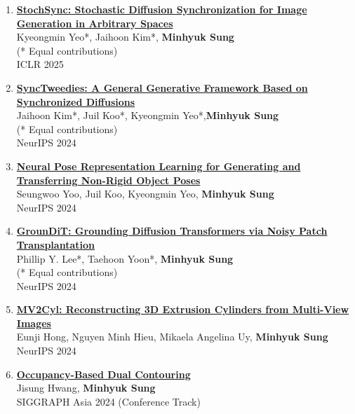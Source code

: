 \documentclass[letterpaper,10pt]{article} %
\newcommand{\blankline}{\quad\pagebreak[2]}
\begin{document}
{{\begin{enumerate}
\item \label{iclr25}
\href{https://arxiv.org/abs/2501.15445}{\textbf{StochSync: Stochastic Diffusion Synchronization for Image Generation in Arbitrary Spaces}}\\
Kyeongmin Yeo*, Jaihoon Kim*, \textbf{Minhyuk Sung}\\
(* Equal contributions)\\
ICLR 2025\\
\blankline

\item \label{neurips24_4}
\href{https://arxiv.org/abs/2403.14370}{\textbf{SyncTweedies: A General Generative Framework Based on Synchronized Diffusions}}\\
Jaihoon Kim*, Juil Koo*, Kyeongmin Yeo*,\textbf{Minhyuk Sung}\\
(* Equal contributions)\\
NeurIPS 2024\\
\blankline

\item \label{neurips24_3}
\href{https://arxiv.org/abs/2406.09728}{\textbf{Neural Pose Representation Learning for Generating and Transferring Non-Rigid Object Poses}}\\
Seungwoo Yoo, Juil Koo, Kyeongmin Yeo, \textbf{Minhyuk Sung}\\
NeurIPS 2024\\
\blankline

\item \label{neurips24_2}
\href{https://arxiv.org/abs/2410.20474}{\textbf{GrounDiT: Grounding Diffusion Transformers via Noisy Patch Transplantation}}\\
Phillip Y. Lee*, Taehoon Yoon*, \textbf{Minhyuk Sung}\\
(* Equal contributions)\\
NeurIPS 2024\\
\blankline

\item \label{neurips24_1}
\href{https://arxiv.org/abs/2406.10853}{\textbf{MV2Cyl: Reconstructing 3D Extrusion Cylinders from Multi-View Images}}\\
Eunji Hong, Nguyen Minh Hieu, Mikaela Angelina Uy, \textbf{Minhyuk Sung}\\
NeurIPS 2024\\
\blankline

\item \label{siggraphasia24}
\href{https://arxiv.org/abs/2409.13418}{\textbf{Occupancy-Based Dual Contouring}}\\
Jisung Hwang, \textbf{Minhyuk Sung}\\
SIGGRAPH Asia 2024 (Conference Track)\\
\blankline


\end{enumerate}}}
\end{document}
